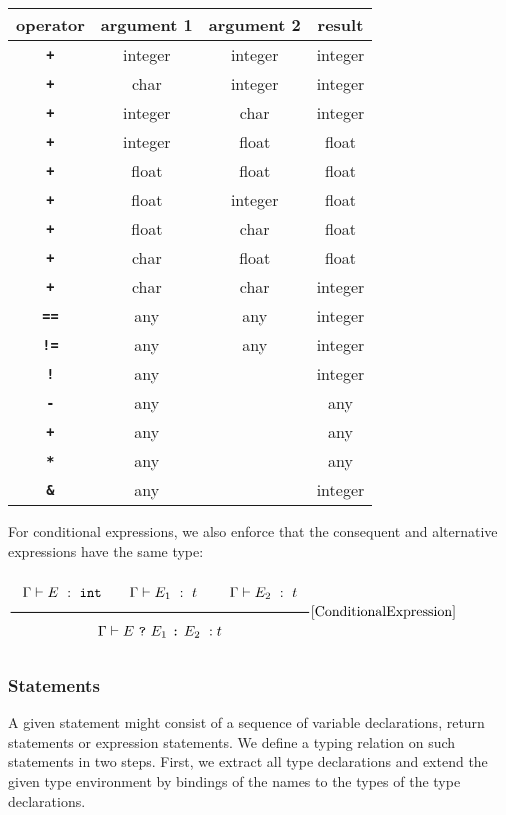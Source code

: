 \documentclass[a4paper]{article}
\newcommand{\RuleWithName}[3]{\genfrac{}{}{0.7pt}{}{{\setlength{\fboxrule}{0pt}\setlength{\fboxsep}{3mm}\fbox{$#1$}}}{{\setlength{\fboxrule}{0pt}\setlength{\fboxsep}{3mm}\fbox{$#2$}}}[\text{#3}]}
\begin{document}
\begin{center}
\begin{tabular}{c|c|c|c}
operator & argument 1 & argument 2 & result\\ \hline
\texttt{\textbf{+}} & integer   & integer     & integer\\
\texttt{\textbf{+}} & char   & integer    & integer\\
\texttt{\textbf{+}} & integer   & char    & integer\\
\texttt{\textbf{+}} & integer   & float     & float\\
\texttt{\textbf{+}} & float   & float    & float\\
\texttt{\textbf{+}} & float   & integer     & float\\
\texttt{\textbf{+}} & float   & char    & float\\
\texttt{\textbf{+}} & char   & float    & float\\
\texttt{\textbf{+}} & char   & char    & integer\\
\texttt{\textbf{==}} & any  & any     & integer\\
\texttt{\textbf{!=}} & any   & any     & integer\\
\texttt{\textbf{!}}    & any &      & integer\\
\texttt{\textbf{-}}    & any &    & any\\
\texttt{\textbf{+}}    & any &    & any\\
\texttt{\textbf{*}}    & any &    & any\\
\texttt{\textbf{\&}}    & any &    & integer\\
\end{tabular}
\end{center}

For conditional expressions, we also enforce that the consequent and alternative expressions have the same type:

\begin{center}
    $\RuleWithName{\Gamma \vdash E\ :\ \texttt{int} \qquad \Gamma\vdash E_1\ :\ t\ \qquad \Gamma \vdash E_2\ :\ t}{\Gamma \vdash  E\  \texttt{?}\ E_1\ \texttt{:}\ E_2\ : t}{ConditionalExpression}$
\end{center}

\subsubsection{Statements}

A given statement might consist of a sequence of variable declarations, return statements or expression statements. We define a typing relation on such statements in two steps. First, we extract all type declarations and extend the given type environment by bindings of the names to the types of the type declarations.
\end{document}
